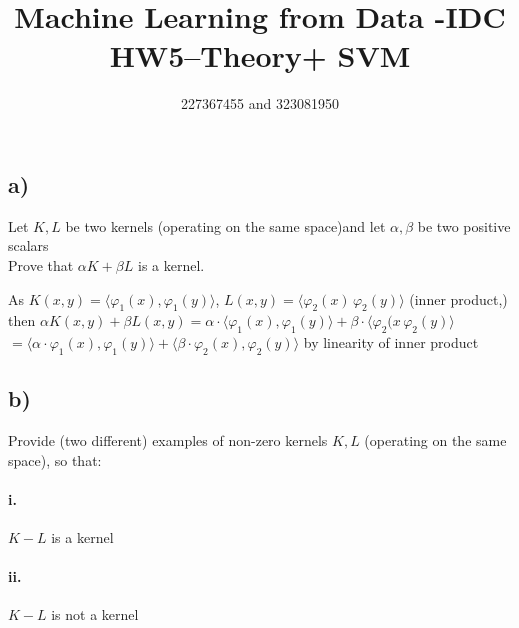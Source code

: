 \documentclass[12pt]{article}
\title{Machine Learning from Data -IDC\\HW5–Theory+ SVM}
\author{227367455 and 323081950}
\newcommand\tab[1][1cm]{\hspace*{#1}}
\begin{document}
\maketitle

\section*{}

\subsection*{a)}

Let $K,L$ be two kernels (operating on the same space)and let $ \alpha, \beta $ be two positive scalars \\
\tab Prove that $\alpha K + \beta L $ is a kernel.

As $K(x,y) = \langle\varphi_{1}(x), \varphi_{1}(y)\rangle$, $L(x,y) = \langle\varphi_{2}(x)\, \varphi_{2}(y)\rangle$ (inner product,) \\
		then $\alpha K(x,y) + \beta L(x,y) = \alpha \cdot \langle \varphi_{1}(x),\varphi_{1}(y)\rangle + \beta \cdot \langle\varphi_{2}(x\,\varphi_{2}(y)\rangle $ \\
		$ = \langle \alpha \cdot \varphi_{1}(x),\varphi_{1}(y)\rangle + \langle\beta \cdot\varphi_{2}(x),\varphi_{2}(y)\rangle $ by linearity of inner product\\
		
\subsection*{b)}

Provide (two different) examples of non-zero kernels $K,L$ (operating on the same space), so that:

\paragraph{\tab i.}

$K - L$ is a kernel

\paragraph{\tab ii.}

$K - L$ is not a kernel
\end{document}
